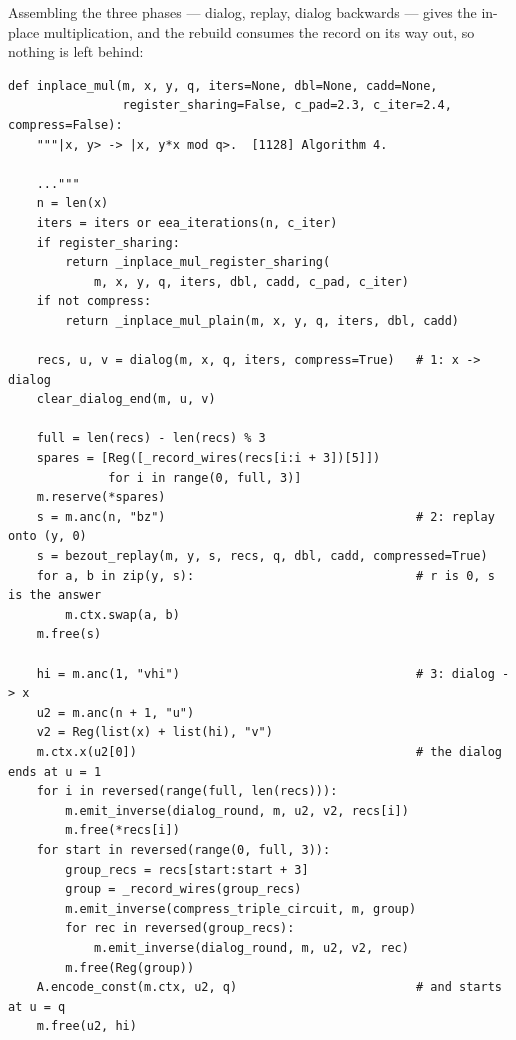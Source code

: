 \documentclass[11pt]{article}
\theoremstyle{plain}
\theoremstyle{remark}
\begin{document}
\noindent
Assembling the three phases --- dialog, replay, dialog backwards --- gives the in-place
multiplication, and the rebuild consumes the record on its way out, so nothing is left behind:

\begin{lstlisting}
def inplace_mul(m, x, y, q, iters=None, dbl=None, cadd=None,
                register_sharing=False, c_pad=2.3, c_iter=2.4, compress=False):
    """|x, y> -> |x, y*x mod q>.  [1128] Algorithm 4.

    ..."""
    n = len(x)
    iters = iters or eea_iterations(n, c_iter)
    if register_sharing:
        return _inplace_mul_register_sharing(
            m, x, y, q, iters, dbl, cadd, c_pad, c_iter)
    if not compress:
        return _inplace_mul_plain(m, x, y, q, iters, dbl, cadd)

    recs, u, v = dialog(m, x, q, iters, compress=True)   # 1: x -> dialog
    clear_dialog_end(m, u, v)

    full = len(recs) - len(recs) % 3
    spares = [Reg([_record_wires(recs[i:i + 3])[5]])
              for i in range(0, full, 3)]
    m.reserve(*spares)
    s = m.anc(n, "bz")                                   # 2: replay onto (y, 0)
    s = bezout_replay(m, y, s, recs, q, dbl, cadd, compressed=True)
    for a, b in zip(y, s):                               # r is 0, s is the answer
        m.ctx.swap(a, b)
    m.free(s)

    hi = m.anc(1, "vhi")                                 # 3: dialog -> x
    u2 = m.anc(n + 1, "u")
    v2 = Reg(list(x) + list(hi), "v")
    m.ctx.x(u2[0])                                       # the dialog ends at u = 1
    for i in reversed(range(full, len(recs))):
        m.emit_inverse(dialog_round, m, u2, v2, recs[i])
        m.free(*recs[i])
    for start in reversed(range(0, full, 3)):
        group_recs = recs[start:start + 3]
        group = _record_wires(group_recs)
        m.emit_inverse(compress_triple_circuit, m, group)
        for rec in reversed(group_recs):
            m.emit_inverse(dialog_round, m, u2, v2, rec)
        m.free(Reg(group))
    A.encode_const(m.ctx, u2, q)                         # and starts at u = q
    m.free(u2, hi)
\end{lstlisting}
\end{document}
